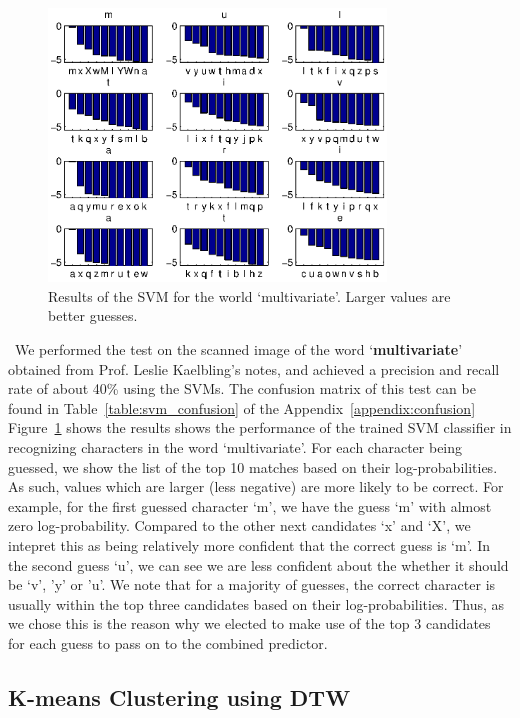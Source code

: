 \documentclass[12pt]{article}
\begin{document}
	\begin{figure}[htbp!]
	\centering
	\includegraphics[width=0.8\textwidth]{svm_result.eps}
	\caption{Results of the SVM for the world `multivariate'. Larger values are better guesses.}
	\label{figure:svm_result}
	\end{figure}
	
	\
	We performed the test on the scanned image of the word `\textbf{multivariate}' obtained from Prof. Leslie Kaelbling's notes, and achieved a precision and recall rate of about 40\% using the SVMs. The confusion matrix of this test can be found in Table~\ref{table:svm_confusion} of the Appendix~\ref{appendix:confusion}	Figure~\ref{figure:svm_result} shows the results shows the performance of the trained SVM classifier in recognizing characters in the word `multivariate'. For each character being guessed, we show the list of the top 10 matches based on their log-probabilities. As such, values which are larger (less negative) are more likely to be correct. For example, for the first guessed character `m', we have the guess `m' with almost zero log-probability. Compared to the other next candidates `x' and `X', we intepret this as being relatively more confident that the correct guess is `m'.  In the second guess `u',  we can see we are less confident about the whether it should be `v', 'y' or 'u'. We note that for a majority of guesses, the correct character is usually within the top three candidates based on their log-probabilities. Thus, as we chose this is the reason why we elected to make use of the top 3 candidates for each guess to pass on to the combined predictor.
	
	\subsection{K-means Clustering using DTW}
	
\end{document}
